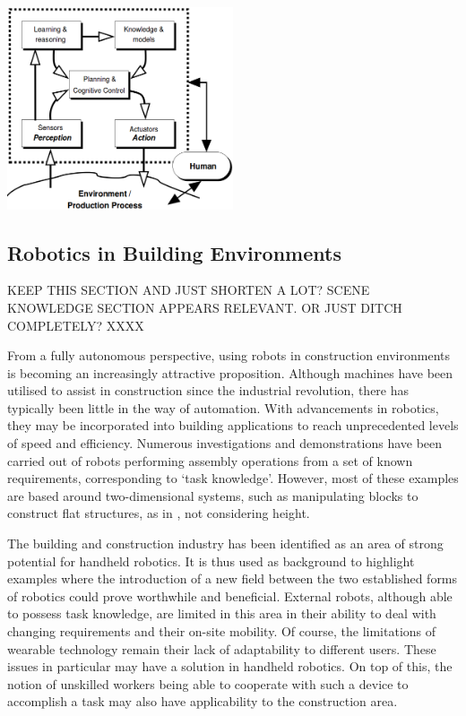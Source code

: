 \documentclass[11pt]{article}
\begin{document}
\begin{center}
\includegraphics[width = 0.5\textwidth]{cognitivearchitecture.png}
\label{figure:cognitivearchitecture}
\end{center}

\pagebreak














\subsection{Robotics in Building Environments} \label{building}

KEEP THIS SECTION AND JUST SHORTEN A LOT? SCENE KNOWLEDGE SECTION APPEARS RELEVANT. OR JUST DITCH COMPLETELY? XXXX

From a fully autonomous perspective, using robots in construction environments is becoming an increasingly attractive proposition. Although machines have been utilised to assist in construction since the industrial revolution, there has typically been little in the way of automation. With advancements in robotics, they may be incorporated into building applications to reach unprecedented levels of speed and efficiency. Numerous investigations and demonstrations have been carried out of robots performing assembly operations from a set of known requirements, corresponding to `task knowledge'. However, most of these examples are based around two-dimensional systems, such as manipulating blocks to construct flat structures, as in \cite{werfel2006}, not considering height.

The building and construction industry has been identified as an area of strong potential for handheld robotics. It is thus used as background to highlight examples where the introduction of a new field between the two established forms of robotics could prove worthwhile and beneficial. External robots, although able to possess task knowledge, are limited in this area in their ability to deal with changing requirements and their on-site mobility. Of course, the limitations of wearable technology remain their lack of adaptability to different users. These issues in particular may have a solution in handheld robotics. On top of this, the notion of unskilled workers being able to cooperate with such a device to accomplish a task may also have applicability to the construction area.
\end{document}
